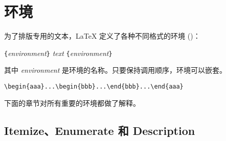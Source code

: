 \section{环境} \label{env}

 为了排版专用的文本，\LaTeX{} 定义了各种不同格式的环境 ()：
\begin{lscommand}
\verb|{|\emph{environment}\verb|}|\quad
   \emph{text}\quad
{}\verb|{|\emph{environment}\verb|}|
\end{lscommand}
\noindent
其中 \emph{environment} 是环境的名称。只要保持调用顺序，环境可以嵌套。
\begin{code}
\verb|\begin{aaa}...\begin{bbb}...\end{bbb}...\end{aaa}|
\end{code}


\noindent 下面的章节对所有重要的环境都做了解释。

\subsection{Itemize、Enumerate 和 Description}

